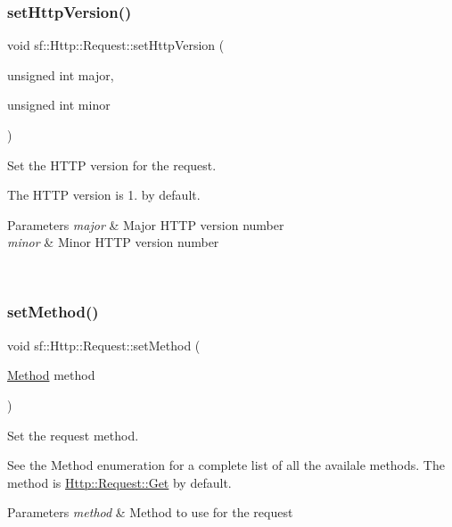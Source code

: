 \subsubsection{\texorpdfstring{setHttpVersion()}{setHttpVersion()}}
{\footnotesize\ttfamily void sf\+::\+Http\+::\+Request\+::set\+Http\+Version (\begin{DoxyParamCaption}\item[{unsigned int}]{major,  }\item[{unsigned int}]{minor }\end{DoxyParamCaption})}



Set the H\+T\+TP version for the request. 

The H\+T\+TP version is 1. by default.


\begin{DoxyParams}{Parameters}
{\em major} & Major H\+T\+TP version number \\
\hline
{\em minor} & Minor H\+T\+TP version number \begin{DoxyVerb}\end{DoxyVerb}
 \\
\hline
\end{DoxyParams}
\mbox{\label{classsf_1_1_http_1_1_request_abab148554e873e80d2e41376fde1cb62}} 
\subsubsection{\texorpdfstring{setMethod()}{setMethod()}}
{\footnotesize\ttfamily void sf\+::\+Http\+::\+Request\+::set\+Method (\begin{DoxyParamCaption}\item[{\mbox{\hyperlink{classsf_1_1_http_1_1_request_a620f8bff6f43e1378f321bf53fbf5598}{Method}}}]{method }\end{DoxyParamCaption})}



Set the request method. 

See the Method enumeration for a complete list of all the availale methods. The method is \mbox{\hyperlink{classsf_1_1_http_1_1_request_a620f8bff6f43e1378f321bf53fbf5598ab822baed393f3d0353621e5378b9fcb4}{Http\+::\+Request\+::\+Get}} by default.


\begin{DoxyParams}{Parameters}
{\em method} & Method to use for the request \begin{DoxyVerb}\end{DoxyVerb}
 \\
\hline
\end{DoxyParams}
\mbox{\label{classsf_1_1_http_1_1_request_a3723de4b4f1a14b744477841c4ac22e6}} 
